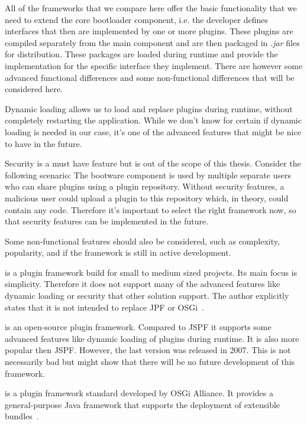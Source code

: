 All of the frameworks that we compare here offer the basic functionality that we need to extend the core bootloader component, i.e. the developer defines interfaces that then are implemented by one or more plugins.
These plugins are compiled separately from the main component and are then packaged in \textit{.jar} files for distribution.
These packages are loaded during runtime and provide the implementation for the specific interface they implement.
There are however some advanced functional differences and some non-functional differences that will be considered here.

Dynamic loading allows us to load and replace plugins during runtime, without completely restarting the application.
While we don't know for certain if dynamic loading is needed in our case, it's one of the advanced features that might be nice to have in the future.

Security is a must have feature but is out of the scope of this thesis.
Consider the following scenario: The bootware component is used by multiple separate users who can share plugins using a plugin repository.
Without security features, a malicious user could upload a plugin to this repository which, in theory, could contain any code.
Therefore it's important to select the right framework now, so that security features can be implemented in the future.

Some non-functional features should also be considered, such as complexity, popularity, and if the framework is still in active development.

 is a plugin framework build for small to medium sized projects.
Its main focus is simplicity.
Therefore it does not support many of the advanced features like dynamic loading or security that other solution support.
The author explicitly states that it is not intended to replace JPF or OSGi~\autocite{jspf:faq}.

 is an open-source plugin framework.
Compared to JSPF it supports some advanced features like dynamic loading of plugins during runtime.
It is also more popular then JSPF.
However, the last version was released in 2007.
This is not necessarily bad but might show that there will be no future development of this framework.

 is a plugin framework standard developed by OSGi Alliance.
It provides a general-purpose Java framework that supports the deployment of extensible bundles~\autocite{osgi:spec}.


